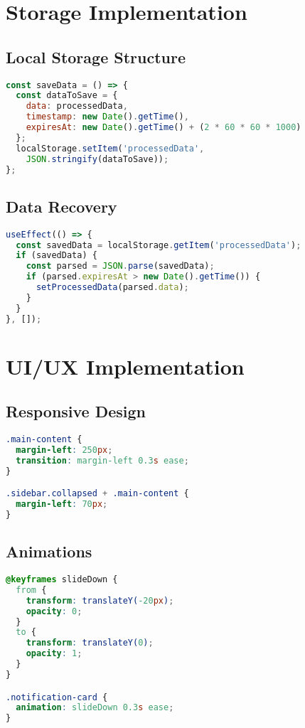 \documentclass[12pt,a4paper]{article}
\begin{document}
\section{Storage Implementation}

\subsection{Local Storage Structure}
\begin{lstlisting}[language=JavaScript]
const saveData = () => {
  const dataToSave = {
    data: processedData,
    timestamp: new Date().getTime(),
    expiresAt: new Date().getTime() + (2 * 60 * 60 * 1000)
  };
  localStorage.setItem('processedData', 
    JSON.stringify(dataToSave));
};
\end{lstlisting}

\subsection{Data Recovery}
\begin{lstlisting}[language=JavaScript]
useEffect(() => {
  const savedData = localStorage.getItem('processedData');
  if (savedData) {
    const parsed = JSON.parse(savedData);
    if (parsed.expiresAt > new Date().getTime()) {
      setProcessedData(parsed.data);
    }
  }
}, []);
\end{lstlisting}

\section{UI/UX Implementation}

\subsection{Responsive Design}
\begin{lstlisting}[language=CSS]
.main-content {
  margin-left: 250px;
  transition: margin-left 0.3s ease;
}

.sidebar.collapsed + .main-content {
  margin-left: 70px;
}
\end{lstlisting}

\subsection{Animations}
\begin{lstlisting}[language=CSS]
@keyframes slideDown {
  from {
    transform: translateY(-20px);
    opacity: 0;
  }
  to {
    transform: translateY(0);
    opacity: 1;
  }
}

.notification-card {
  animation: slideDown 0.3s ease;
}
\end{lstlisting}
\end{document}
